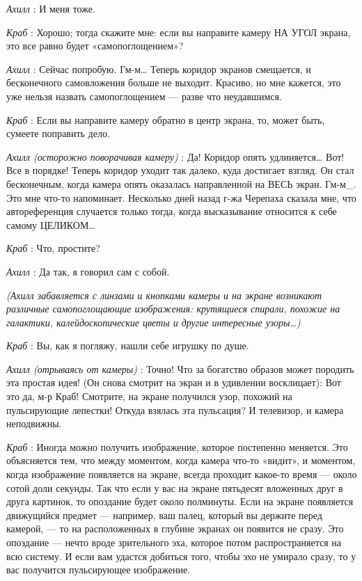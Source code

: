 \emph{Ахилл} : И меня тоже.

\emph{Краб} : Хорошо; тогда скажите мне: если вы направите камеру НА УГОЛ экрана, это все равно будет «самопоглощением»?

\emph{Ахилл} : Сейчас попробую. Гм-м\ldots{} Теперь коридор экранов смещается, и бесконечного самовложения больше не выходит. Красиво, но мне кажется, это уже нельзя назвать самопоглощением --- разве что неудавшимся.

\emph{Краб} : Если вы направите камеру обратно в центр экрана, то, может быть, сумеете поправить дело.

\emph{Ахилл (осторожно поворачивая камеру)} : Да! Коридор опять удлиняется\ldots{} Вот! Все в порядке! Теперь коридор уходит так далеко, куда достигает взгляд. Он стал бесконечным, когда камера опять оказалась направленной на ВЕСЬ экран. Гм-м\_. Это мне что-то напоминает. Несколько дней назад г-жа Черепаха сказала мне, что автореференция случается только тогда, когда высказывание относится к себе самому ЦЕЛИКОМ\ldots{}

\emph{Краб} : Что, простите?

\emph{Ахилл} : Да так, я говорил сам с собой.

\emph{(Ахилл забавляется с линзами и кнопками камеры и на экране возникают различные самопоглощающие изображения: крутящиеся спирали, похожие на галактики, калейдоскопические цветы и другие интересные узоры\ldots)}

\emph{Краб} : Вы, как я погляжу, нашли себе игрушку по душе.

\emph{Ахилл (отрываясь от камеры)} : Точно! Что за богатство образов может породить эта простая идея! (Он снова смотрит на экран и в удивлении восклицает): Вот это да, м-р Краб! Смотрите, на экране получился узор, похожий на пульсирующие лепестки! Откуда взялась эта пульсация? И телевизор, и камера неподвижны.

\emph{Краб} : Иногда можно получить изображение, которое постепенно меняется. Это объясняется тем, что между моментом, когда камера что-то «видит», и моментом, когда изображение появляется на экране, всегда проходит какое-то время --- около сотой доли секунды. Так что если у вас на экране пятьдесят вложенных друг в друга картинок, то опоздание будет около полминуты. Если на экране появляется движущийся предмет --- например, ваш палец, который вы держите перед камерой, --- то на расположенных в глубине экранах он появится не сразу. Это опоздание --- нечто вроде зрительного эха, которое потом распространяется на всю систему. И если вам удастся добиться того, чтобы эхо не умирало сразу, то у вас получится пульсирующее изображение.

